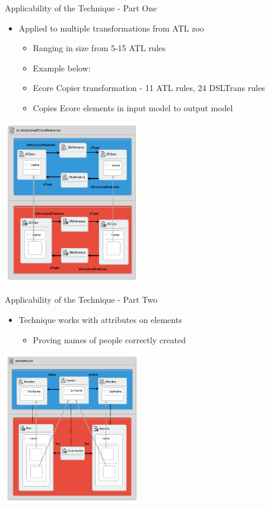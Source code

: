 \documentclass[xcolor=dvipsnames, 12pt]{beamer}
\begin{document}
\begin{frame}{Applicability of the Technique - Part One}
\begin{itemize}[<+->]
\item Applied to multiple transformations from ATL zoo
\begin{itemize}[<+->]
\item Ranging in size from 5-15 ATL rules
\end{itemize}
\begin{itemize}[<+->]
\item Example below:
\item Ecore Copier transformation - 11 ATL rules, 24 DSLTrans rules
\item Copies Ecore elements in input model to output model
\end{itemize}
\end{itemize}
\pause
\begin{center}
\includegraphics[width=0.45\textwidth]{figures/Ecore_copier_prop1}
\end{center}
\end{frame}

\begin{frame}{Applicability of the Technique - Part Two}
\begin{itemize}
\item Technique works with attributes on elements
\begin{itemize}
\item Proving names of people correctly created
\end{itemize}
\end{itemize}
\pause
\begin{center}
\includegraphics[width=0.45\textwidth]{figures/motherFatherProp}
\end{center}
\end{frame}
\end{document}
